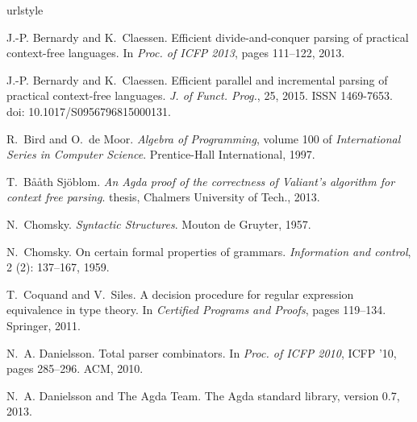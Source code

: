 \documentclass{CSML}
\numberwithin{theorem}{section}
\begin{document}
\newcommand{\HREF}[2]{\href{#2}{#1}} 
\begin{thebibliography}{21}
\providecommand{\natexlab}[1]{#1}
\providecommand{\url}[1]{\texttt{#1}}
\expandafter\ifx\csname urlstyle\endcsname\relax
  \providecommand{\doi}[1]{doi: #1}\else
  \providecommand{\doi}{doi: \begingroup \urlstyle{rm}\Url}\fi

J.-P. Bernardy and K.~Claessen.
\newblock Efficient divide-and-conquer parsing of practical context-free
  languages.
\newblock In \emph{Proc. of ICFP 2013}, pages 111--122, 2013.

J.-P. Bernardy and K.~Claessen.
\newblock Efficient parallel and incremental parsing of practical context-free
  languages.
\newblock \emph{J. of Funct. Prog.}, 25, 2015.
\newblock ISSN 1469-7653.
\newblock \doi{10.1017/S0956796815000131}.

R.~Bird and O.~{de Moor}.
\newblock \emph{Algebra of Programming}, volume 100 of \emph{International
  Series in Computer Science}.
\newblock Prentice-Hall International, 1997.

T.~{Bååth Sjöblom}.
\newblock \emph{An {Agda} proof of the correctness of {Valiant}'s algorithm for
  context free parsing}.
 thesis, Chalmers University of Tech., 2013.

N.~Chomsky.
\newblock \emph{Syntactic Structures}.
\newblock Mouton de Gruyter, 1957.

N.~Chomsky.
\newblock On certain formal properties of grammars.
\newblock \emph{Information and control}, 2 (2): 137--167,
  1959.

T.~Coquand and V.~Siles.
\newblock A decision procedure for regular expression equivalence in type
  theory.
\newblock In \emph{Certified Programs and Proofs}, pages 119--134. Springer,
  2011.

N.~A. Danielsson.
\newblock Total parser combinators.
\newblock In \emph{Proc. of ICFP 2010}, ICFP '10, pages 285--296. ACM, 2010.

N.~A. Danielsson and {The Agda Team}.
\newblock The {Agda} standard library, version 0.7, 2013.


\end{thebibliography}
\end{document}
